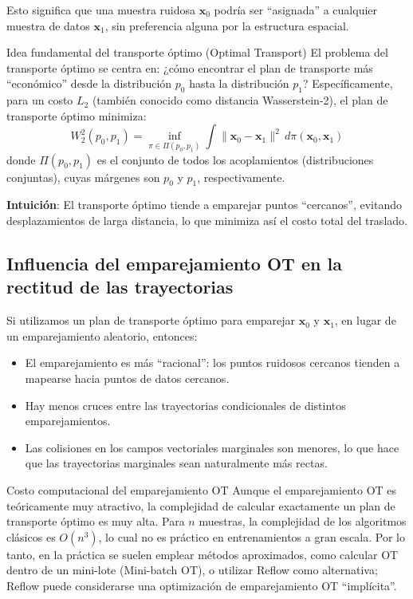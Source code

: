 \documentclass[a4paper]{article}
\begin{document}
Esto significa que una muestra ruidosa $\mathbf{x}_0$ podría ser ``asignada'' a cualquier muestra de datos $\mathbf{x}_1$, sin preferencia alguna por la estructura espacial.

\begin{importantbox}{Idea fundamental del transporte óptimo (Optimal Transport)}
El problema del transporte óptimo se centra en: ¿cómo encontrar el plan de transporte más ``económico'' desde la distribución $p_0$ hasta la distribución $p_1$? Específicamente, para un costo $L_2$ (también conocido como distancia Wasserstein-2), el plan de transporte óptimo minimiza:
$$W_2^2(p_0, p_1) = \inf_{\pi \in \Pi(p_0, p_1)} \int \|\mathbf{x}_0 - \mathbf{x}_1\|^2 \, d\pi(\mathbf{x}_0, \mathbf{x}_1)$$
donde $\Pi(p_0, p_1)$ es el conjunto de todos los acoplamientos (distribuciones conjuntas), cuyas márgenes son $p_0$ y $p_1$, respectivamente.

\medskip
\textbf{Intuición}: El transporte óptimo tiende a emparejar puntos ``cercanos'', evitando desplazamientos de larga distancia, lo que minimiza así el costo total del traslado.
\end{importantbox}

\subsection{Influencia del emparejamiento OT en la rectitud de las trayectorias}

Si utilizamos un plan de transporte óptimo para emparejar $\mathbf{x}_0$ y $\mathbf{x}_1$, en lugar de un emparejamiento aleatorio, entonces:

\begin{itemize}
    \item El emparejamiento es más ``racional'': los puntos ruidosos cercanos tienden a mapearse hacia puntos de datos cercanos.
    \item Hay menos cruces entre las trayectorias condicionales de distintos emparejamientos.
    \item Las colisiones en los campos vectoriales marginales son menores, lo que hace que las trayectorias marginales sean naturalmente más rectas.
\end{itemize}

\begin{warningbox}{Costo computacional del emparejamiento OT}
Aunque el emparejamiento OT es teóricamente muy atractivo, la complejidad de calcular exactamente un plan de transporte óptimo es muy alta. Para $n$ muestras, la complejidad de los algoritmos clásicos es $O(n^3)$, lo cual no es práctico en entrenamientos a gran escala. Por lo tanto, en la práctica se suelen emplear métodos aproximados, como calcular OT dentro de un mini-lote (Mini-batch OT), o utilizar Reflow como alternativa; Reflow puede considerarse una optimización de emparejamiento OT ``implícita''.
\end{warningbox}
\end{document}
